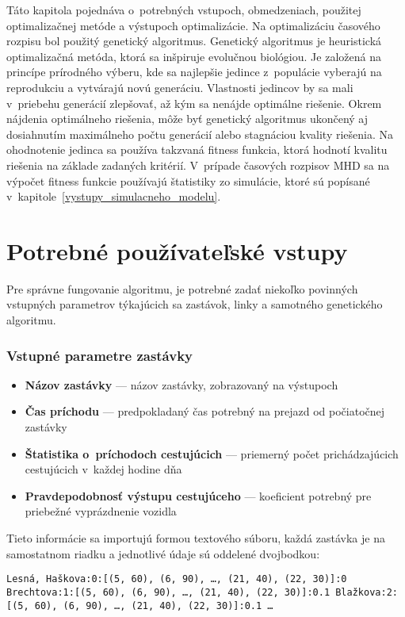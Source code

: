 Táto kapitola pojednáva o~potrebných vstupoch, obmedzeniach, použitej optimalizačnej metóde a výstupoch optimalizácie.
Na optimalizáciu časového rozpisu bol použitý genetický algoritmus.
Genetický algoritmus je heuristická optimalizačná metóda, ktorá sa inšpiruje evolučnou biológiou.
Je založená na princípe prírodného výberu, kde sa najlepšie jedince z~populácie vyberajú na reprodukciu a vytvárajú novú generáciu.
Vlastnosti jedincov by sa mali v~priebehu generácií zlepšovať, až kým sa nenájde optimálne riešenie.
Okrem nájdenia optimálneho riešenia, môže byť genetický algoritmus ukončený aj dosiahnutím maximálneho počtu generácií alebo stagnáciou kvality riešenia.
Na ohodnotenie jedinca sa používa takzvaná fitness funkcia, ktorá hodnotí kvalitu riešenia na základe zadaných kritérií.
V~prípade časových rozpisov MHD sa na výpočet fitness funkcie používajú štatistiky zo simulácie, ktoré sú popísané v~kapitole~\ref{vystupy_simulacneho_modelu}.

\section{Potrebné používateľské vstupy}\label{vstupy_pouzivatela}
Pre správne fungovanie algoritmu, je potrebné zadať niekoľko povinných vstupných parametrov týkajúcich sa zastávok, linky a samotného genetického algoritmu.

\subsubsection{Vstupné parametre zastávky}
\begin{itemize}
  \item \textbf{Názov zastávky} --- názov zastávky, zobrazovaný na výstupoch
  \item \textbf{Čas príchodu} --- predpokladaný čas potrebný na prejazd od počiatočnej zastávky
  \item \textbf{Štatistika o~príchodoch cestujúcich} --- priemerný počet prichádzajúcich cestujúcich v~každej hodine dňa
  \item \textbf{Pravdepodobnosť výstupu cestujúceho} --- koeficient potrebný pre priebežné vyprázdnenie vozidla
\end{itemize}
Tieto informácie sa importujú formou textového súboru, každá zastávka je na samostatnom riadku a jednotlivé údaje sú oddelené dvojbodkou:

\noindent \texttt{Lesná, Haškova:0:[(5, 60), (6, 90), \ldots , (21, 40), (22, 30)]:0 \newline
  Brechtova:1:[(5, 60), (6, 90), \ldots , (21, 40), (22, 30)]:0.1 \newline
  Blažkova:2:[(5, 60), (6, 90), \ldots , (21, 40), (22, 30)]:0.1 \newline
  \ldots
}

